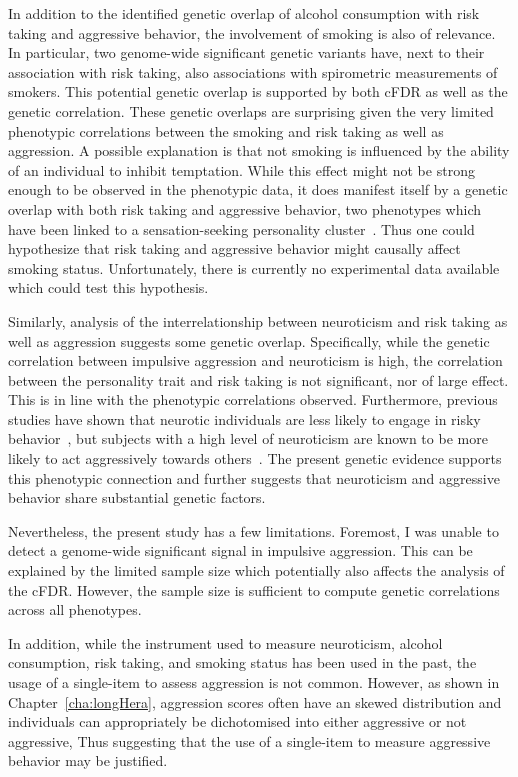 In addition to the identified genetic overlap of alcohol consumption with risk taking and aggressive behavior, the involvement of smoking is also of relevance.
In particular, two genome-wide significant genetic variants have, next to their association with risk taking, also associations with spirometric measurements of smokers.
This potential genetic overlap is supported by both cFDR as well as the genetic correlation.
These genetic overlaps are surprising given the very limited phenotypic correlations between the smoking and risk taking as well as aggression.
A possible explanation is that not smoking is influenced by the ability of an individual to  inhibit temptation.
While this effect might not be strong enough to be observed in the phenotypic data, it does manifest itself by a genetic overlap with both risk taking and aggressive behavior,
two phenotypes which have been linked to a sensation-seeking personality cluster~\cite{Zuckerman2000}.
Thus one could hypothesize that risk taking and aggressive behavior might causally affect smoking status.
Unfortunately, there is currently no experimental data available which could test this hypothesis.

Similarly, analysis of the interrelationship between neuroticism and risk taking as well as aggression suggests some genetic overlap.
Specifically, while the genetic correlation between impulsive aggression and neuroticism is high, the correlation between the personality trait and risk taking is not significant, nor of large effect.
This is in line with the phenotypic correlations observed.
Furthermore, previous studies have shown that neurotic individuals are less likely to engage in risky behavior~\cite{Lauriola2001,InstituteofMedicine2011,Paulus2003}, but subjects with a high level of neuroticism are known to be more likely to act aggressively towards others~\cite{Meesters2007}.
The present genetic evidence supports this phenotypic connection and further suggests that neuroticism and aggressive behavior share substantial genetic factors.

Nevertheless, the  present study has a few limitations.
Foremost, I was unable to detect a genome-wide significant signal in impulsive aggression.
This can be explained by the limited sample size which potentially also affects the analysis of the cFDR\@.
However, the sample size is sufficient to compute genetic correlations across all  phenotypes.

In addition, while the instrument used to measure  neuroticism, alcohol consumption, risk taking, and smoking status has been used in the past, the usage of a single-item to assess aggression is not common.
However, as shown in Chapter~\ref{cha:longHera},  aggression scores often have an skewed distribution and individuals can appropriately be dichotomised into either aggressive or not aggressive,
Thus suggesting that the use of a single-item to measure aggressive behavior may be justified.

